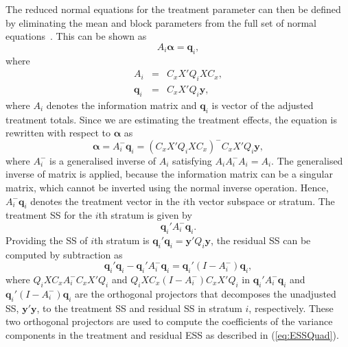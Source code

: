 \documentclass[article]{jss}
\begin{document}
The reduced normal equations for the treatment parameter can then be defined by eliminating the mean and block parameters from the full set of normal equations~\citep{John1987}. This can be shown as
\[
A_i\bm{\alpha} = \bm{q}_i,
\]
where
\begin{eqnarray*}
A_i &=& C_x X' Q_i X C_x ,\\
\bm{q}_i &=& C_x X' Q_i \bm{y},
\end{eqnarray*}
where $A_i$ denotes the information matrix and $\bm{q}_i$ is vector of the adjusted treatment totals. Since we are estimating the treatment effects, the equation is rewritten with respect to $\bm{\alpha}$ as
\begin{equation}
\label{eq:trtVec}
\bm{\alpha} = A_{i}^{-} \bm{q}_i = (C_x X' Q_i XC_x )^{-}C_x X' Q_i \bm{y},
\end{equation}
where $A_{i}^{-}$ is a generalised inverse of $A_{i}$ satisfying $A_{i} A_{i}^{-} A_{i} = A_{i}$. The generalised inverse of matrix is applied, because the information matrix can be a singular matrix, which cannot be inverted using the normal inverse operation. Hence, $A_{i}^{-} \bm{q}_i$ denotes the treatment vector in the $i$th vector subspace or stratum. The treatment SS for the $i$th stratum is given by
\begin{equation}
\label{eq:trtSS}
\bm{q}_{i}' A_{i}^{-} \bm{q}_{i}.
\end{equation}
Providing the SS of $i$th stratum is $\bm{q}_{i}'\bm{q}_{i} = \bm{y}' Q_i\bm{y}$, the residual SS can be computed by subtraction as 
\begin{equation}
\label{eq:resSS}
\bm{q}_{i}'\bm{q}_{i} - \bm{q}_{i}' A_{i}^{-} \bm{q}_{i} = \bm{q}_{i}' ( I -A_{i}^{-}) \bm{q}_{i},
\end{equation}
where $Q_iX C_x A_{i}^{-}C_x X' Q_i$ and $Q_iX C_x ( I - A_{i}^{-}) C_x X' Q_i$ in $\bm{q}_{i}' A_{i}^{-} \bm{q}_{i}$ and $\bm{q}_{i}' ( I -A_{i}^{-}) \bm{q}_i$ are the orthogonal projectors that decomposes the unadjusted SS, $\bm{y}' \bm{y}$, to the treatment SS and residual SS in stratum $i$, respectively. These two orthogonal projectors are used to compute the coefficients of the variance components in the treatment and residual ESS as described in (\ref{eq:ESSQuad}).
\end{document}
